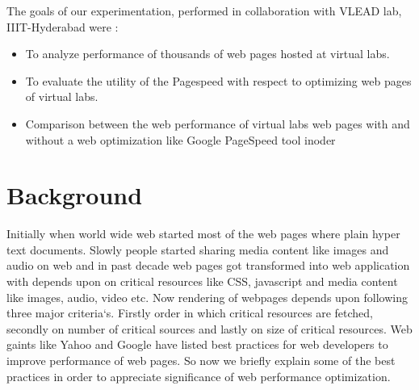 \documentclass[conference]{IEEEtran}
\begin{document}
The goals of our experimentation, performed in collaboration with VLEAD lab,
IIIT-Hyderabad were :

\begin{itemize}
\item To analyze performance of thousands of web pages hosted at virtual labs.
\item To evaluate the utility of the Pagespeed with respect to optimizing web pages of virtual labs.
\item Comparison between the web performance of virtual labs web pages with
and without a web optimization like Google PageSpeed tool inoder
\end{itemize}

\section{Background}\label{sec-3}
Initially when world wide web started most of the web pages where plain hyper text documents.
Slowly people started sharing media content like images and audio on web and in past decade
web pages got transformed into web application with depends upon on critical resources
like CSS, javascript and media content like images, audio, video etc. Now rendering of webpages depends upon
following three major criteria`s. Firstly order in which critical resources are fetched, secondly on
number of critical sources and lastly on size of critical resources. Web gaints like Yahoo and Google
have listed best practices for web developers to improve performance of web pages. So now we briefly
explain some of the best practices in order to appreciate significance of web performance optimization.
\end{document}
